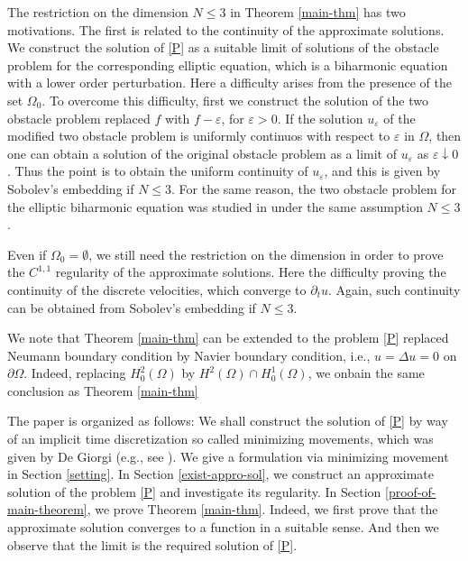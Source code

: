 \documentclass[12pt]{amsart}
\begin{document}
The restriction on the dimension $N\le 3$ in Theorem \ref{main-thm} has two motivations.
The first is related to the continuity of the approximate solutions. 
We construct the solution of \eqref{P} as a suitable limit of solutions of the 
obstacle problem 
for the corresponding elliptic equation, 
which is a biharmonic equation with a lower order perturbation. 
Here a difficulty arises from the presence of the set $\Omega_{0}$. 
To overcome this difficulty, first we construct the solution of the two obstacle problem replaced $f$ with $f - {\varepsilon}$, for ${\varepsilon}>0$. 
If the solution $u_{\varepsilon}$ of the modified two obstacle problem is uniformly continuos with respect to ${\varepsilon}$ in $\Omega$, 
then one can obtain a solution of the original obstacle problem as a limit of $u_{\varepsilon}$ as ${\varepsilon} \downarrow 0$. 
Thus the point is to obtain the uniform continuity of $u_{\varepsilon}$,
and this is given by Sobolev's embedding if $N\le 3$. 
For the same reason, the two obstacle problem for the elliptic biharmonic equation was studied in \cite{CFT} 
under the same assumption $N \le 3$.

Even if $\Omega_0=\emptyset$, we still need the restriction on the dimension
in order to prove the $C^{1,1}$ regularity of the approximate solutions. 
Here the difficulty proving the continuity of the discrete velocities, 
which converge to ${\partial}_{t} u$. Again, such continuity can be obtained from 
Sobolev's embedding if $N\le 3$. 

We note that Theorem \ref{main-thm} can be extended to the problem \eqref{P} replaced Neumann boundary condition by Navier boundary 
condition, i.e., $u = \Delta u = 0$ on ${\partial} \Omega$. 
Indeed, replacing $H^{2}_{0}(\Omega)$ by $H^{2}(\Omega) \cap H^{1}_{0}(\Omega)$, 
we onbain the same conclusion as Theorem \ref{main-thm}

\smallskip

The paper is organized as follows: We shall construct the solution of \eqref{P} by way of an implicit time discretization so called 
minimizing movements, which was given by De Giorgi (e.g., see \cite{A}). 
We give a formulation via minimizing movement in Section \ref{setting}. 
In Section \ref{exist-appro-sol}, we construct an approximate solution of the problem \eqref{P} and investigate its regularity. 
In Section \ref{proof-of-main-theorem}, we prove Theorem \ref{main-thm}. 
Indeed, we first prove that the approximate solution converges to a function in a suitable sense. 
And then we observe that the limit is the required solution of \eqref{P}. 
\end{document}
